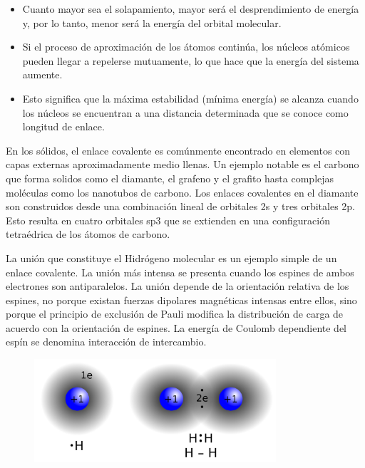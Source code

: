 \documentclass{article}
\begin{document}
\begin{itemize}
    \item Cuanto mayor sea el solapamiento, mayor será el desprendimiento de energía y, por lo tanto, menor será la energía del orbital molecular. 
    
    \item Si el proceso de aproximación de los átomos continúa, los núcleos atómicos pueden llegar a repelerse mutuamente, lo que hace que la energía del sistema aumente.
    
    \item Esto significa que la máxima estabilidad (mínima energía) se alcanza cuando los núcleos se encuentran a una distancia determinada que se conoce como longitud de enlace.
\end{itemize}{}

En los sólidos, el enlace covalente es comúnmente encontrado en elementos con capas externas aproximadamente medio llenas. Un ejemplo notable es el carbono que forma solidos como el diamante, el grafeno y el grafito hasta complejas moléculas como los nanotubos de carbono. Los enlaces covalentes en el diamante son construidos desde una combinación lineal de orbitales 2s y tres orbitales 2p. Esto resulta en cuatro orbitales sp3 que se extienden en una configuración tetraédrica de los átomos de carbono.

La unión que constituye el Hidrógeno molecular es un ejemplo simple de un enlace covalente. La unión más intensa se presenta cuando los espines de ambos electrones son antiparalelos. La unión depende de la orientación relativa de los espines, no porque existan fuerzas dipolares magnéticas intensas entre ellos, sino porque el principio de exclusión de Pauli modifica la distribución de carga de acuerdo con la orientación de espines. La energía de Coulomb dependiente del espín se denomina interacción de intercambio.

\begin{figure}[h]
    \centering
    \includegraphics[width=0.8\textwidth]{hidrogeno_molecular.png}
    \label{Figura 1}
\end{figure}
\end{document}
